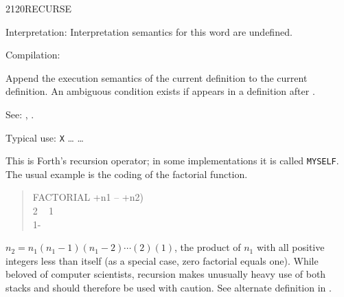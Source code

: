 \begin{newword*}{2120}{RECURSE}
\item[Interpretation:]
	Interpretation semantics for this word are undefined.

\item[Compilation:]
	\stack{}{}

	Append the execution semantics of the current definition to
	the current definition. An ambiguous condition exists if
	 appears in a definition after .

\item[See:]
	,
	.

	\begin{rationale} %
		Typical use:
			\word{:} \texttt{X} {\ldots}  {\ldots} \word{;}

		This is Forth's recursion operator; in some implementations it
		is called \texttt{MYSELF}. The usual example is the coding of
		the factorial function.

		\begin{quote}\ttfamily
		\word{:} FACTORIAL  +n1 -- +n2) \\
		\tab {} 2  ~
				 1 ~
			 \\
		\tab {} 1- ~~ \word{*} \\
		\word{;}
		\end{quote}

		$n_2 = n_1(n_1-1)(n_1-2)\cdots(2)(1)$, the product of $n_1$
		with all positive integers less than itself (as a special case,
		zero factorial equals one). While beloved of computer scientists,
		recursion makes unusually heavy use of both stacks and should
		therefore be used with caution. See alternate definition in
		.
	\end{rationale}
\end{newword*}


